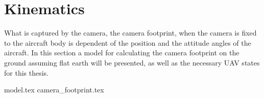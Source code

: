 \chapter{Kinematics}
\label{ch:kinematics}

What is captured by the camera, the camera footprint, when the camera is fixed to the aircraft body is dependent of the position and the attitude angles of the aircraft. In this section a model for calculating the camera footprint on the ground assuming flat earth will be presented, as well as the necessary UAV states for this thesis.

{model.tex}
{camera_footprint.tex}